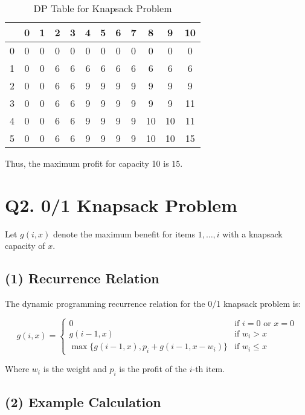 \documentclass{article}
\begin{document}
\begin{table}[h!]
    \centering
    \begin{tabular}{c|ccccccccccc}
          & 0 & 1 & 2 & 3 & 4 & 5 & 6 & 7 & 8  & 9  & 10 \\
        \hline
        0 & 0 & 0 & 0 & 0 & 0 & 0 & 0 & 0 & 0  & 0  & 0  \\
        1 & 0 & 0 & 6 & 6 & 6 & 6 & 6 & 6 & 6  & 6  & 6  \\
        2 & 0 & 0 & 6 & 6 & 9 & 9 & 9 & 9 & 9  & 9  & 9  \\
        3 & 0 & 0 & 6 & 6 & 9 & 9 & 9 & 9 & 9  & 9  & 11 \\
        4 & 0 & 0 & 6 & 6 & 9 & 9 & 9 & 9 & 10 & 10 & 11 \\
        5 & 0 & 0 & 6 & 6 & 9 & 9 & 9 & 9 & 10 & 10 & 15 \\
    \end{tabular}
    \caption{DP Table for Knapsack Problem}
\end{table}

Thus, the maximum profit for capacity 10 is \( 15 \).

\section{Q2. 0/1 Knapsack Problem}

Let \( g(i, x) \) denote the maximum benefit for items \( 1, \ldots, i \) with a knapsack capacity of \( x \).

\subsection*{(1) Recurrence Relation}

The dynamic programming recurrence relation for the 0/1 knapsack problem is:

\[
    g(i, x) =
    \begin{cases}
        0                                        & \text{if } i = 0 \text{ or } x = 0 \\
        g(i-1, x)                                & \text{if } w_i > x                 \\
        \max\{g(i-1, x), p_i + g(i-1, x - w_i)\} & \text{if } w_i \leq x
    \end{cases}
\]

Where \( w_i \) is the weight and \( p_i \) is the profit of the \( i \)-th item.

\subsection*{(2) Example Calculation}
\end{document}
